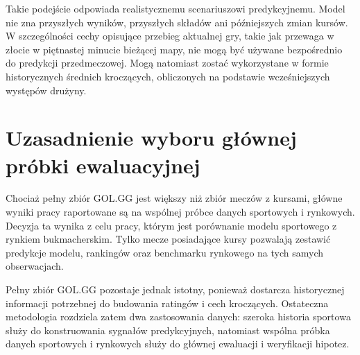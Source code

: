 Takie podejście odpowiada realistycznemu scenariuszowi predykcyjnemu. Model nie zna przyszłych wyników, przyszłych składów ani późniejszych zmian kursów. W szczególności cechy opisujące przebieg aktualnej gry, takie jak przewaga w złocie w piętnastej minucie bieżącej mapy, nie mogą być używane bezpośrednio do predykcji przedmeczowej. Mogą natomiast zostać wykorzystane w formie historycznych średnich kroczących, obliczonych na podstawie wcześniejszych występów drużyny.

\section{Uzasadnienie wyboru głównej próbki ewaluacyjnej}

Chociaż pełny zbiór GOL.GG jest większy niż zbiór meczów z kursami, główne wyniki pracy raportowane są na wspólnej próbce danych sportowych i rynkowych. Decyzja ta wynika z celu pracy, którym jest porównanie modelu sportowego z rynkiem bukmacherskim. Tylko mecze posiadające kursy pozwalają zestawić predykcje modelu, rankingów oraz benchmarku rynkowego na tych samych obserwacjach.

Pełny zbiór GOL.GG pozostaje jednak istotny, ponieważ dostarcza historycznej informacji potrzebnej do budowania ratingów i cech kroczących. Ostateczna metodologia rozdziela zatem dwa zastosowania danych: szeroka historia sportowa służy do konstruowania sygnałów predykcyjnych, natomiast wspólna próbka danych sportowych i rynkowych służy do głównej ewaluacji i weryfikacji hipotez.
